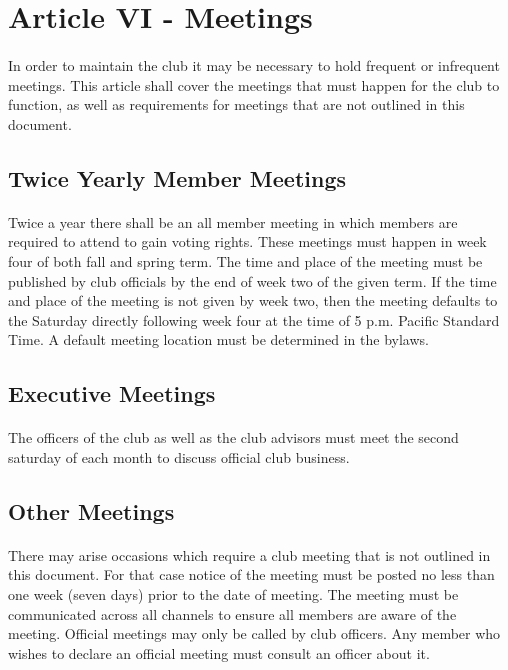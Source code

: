\documentclass[12pt]{article}
\newcommand{\article}[1]{
\setcounter{section}{0}
\setcounter{subsection}{0}

	\section*{#1}
	\addcontentsline{toc}{section}{#1}
	
}
\begin{document}
\article{Article VI - Meetings}
\paragraph{}
In order to maintain the club it may be necessary to hold frequent or infrequent meetings. This article shall cover the meetings that must happen for the club to function, as well as requirements for meetings that are not outlined in this document.

\subsection{Twice Yearly Member Meetings}
\paragraph{}
Twice a year there shall be an all member meeting in which members are required to attend to gain voting rights. These meetings must happen in week four of both fall and spring term. The time and place of the meeting must be published by club officials by the end of week two of the given term. If the time and place of the meeting is not given by week two, then the meeting defaults to the Saturday directly following week four at the time of 5 p.m. Pacific Standard Time. A default meeting location must be determined in the bylaws.

\subsection{Executive Meetings}
\paragraph{}
The officers of the club as well as the club advisors must meet the second saturday of each month to discuss official club business.

\subsection{Other Meetings}
\paragraph{}
There may arise occasions which require a club meeting that is not outlined in this document. For that case notice of the meeting must be posted no less than one week (seven days) prior to the date of meeting. The meeting must be communicated across all channels to ensure all members are aware of the meeting. Official meetings may only be called by club officers. Any member who wishes to declare an official meeting must consult an officer about it.
\end{document}
